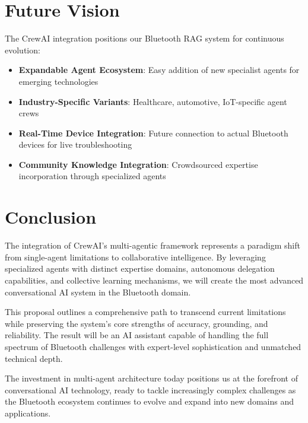 \documentclass[11pt, a4paper]{article}
\begin{document}
\section{Future Vision}

The CrewAI integration positions our Bluetooth RAG system for continuous evolution:

\begin{itemize}
    \item \textbf{Expandable Agent Ecosystem}: Easy addition of new specialist agents for emerging technologies
    \item \textbf{Industry-Specific Variants}: Healthcare, automotive, IoT-specific agent crews
    \item \textbf{Real-Time Device Integration}: Future connection to actual Bluetooth devices for live troubleshooting
    \item \textbf{Community Knowledge Integration}: Crowdsourced expertise incorporation through specialized agents
\end{itemize}

\section{Conclusion}

The integration of CrewAI's multi-agentic framework represents a paradigm shift from single-agent limitations to collaborative intelligence. By leveraging specialized agents with distinct expertise domains, autonomous delegation capabilities, and collective learning mechanisms, we will create the most advanced conversational AI system in the Bluetooth domain.

This proposal outlines a comprehensive path to transcend current limitations while preserving the system's core strengths of accuracy, grounding, and reliability. The result will be an AI assistant capable of handling the full spectrum of Bluetooth challenges with expert-level sophistication and unmatched technical depth.

The investment in multi-agent architecture today positions us at the forefront of conversational AI technology, ready to tackle increasingly complex challenges as the Bluetooth ecosystem continues to evolve and expand into new domains and applications.
\end{document}
